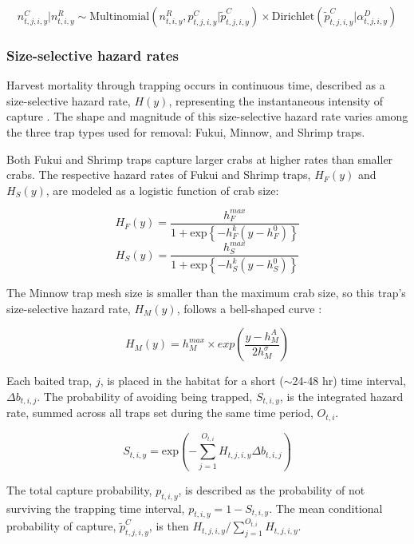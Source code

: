 \documentclass{article}
\begin{document}
\begin{equation}
n^C_{t,j,i,y} | n^R_{t,i,y} \sim \text{Multinomial}(n^R_{t,i,y}, p^C_{t,j,i,y}|\tilde{p}^C_{t,j,i,y}) \times \text{Dirichlet}(\tilde{p}^C_{t,j,i,y}| \alpha^D_{t,j,i,y})
\end{equation}

\subsubsection*{Size-selective hazard rates}

Harvest mortality through trapping occurs in continuous time, described as a size-selective hazard rate, $H(y)$, representing the instantaneous intensity of capture \parencite{ergon2018utility}. The shape and magnitude of this size-selective hazard rate varies among the three trap types used for removal: Fukui, Minnow, and Shrimp traps.

Both Fukui and Shrimp traps capture larger crabs at higher rates than smaller crabs. The respective hazard rates of Fukui and Shrimp traps, $H_F(y)$ and $H_S(y)$, are modeled as a logistic function of crab size:

\begin{equation}
H_F(y) = \frac{h^{max}_F}{1+\text{exp}\left\{-h^k_F(y-h^0_F)\right\}}
\end{equation}
\begin{equation}
H_S(y) = \frac{h^{max}_S}{1+\text{exp}\left\{-h^k_S(y-h^0_S)\right\}}
\end{equation}

The Minnow trap mesh size is smaller than the maximum crab size, so this trap's size-selective hazard rate, $H_M(y)$, follows a bell-shaped curve \parencite{jorgensen2009size}:

\begin{equation}
H_M(y) = h^{max}_M \times exp(\frac{y-h^{A}_M}{2 h^{\sigma}_M})
\end{equation}

Each baited trap, $j$, is placed in the habitat for a short ($\sim$24-48 hr) time interval, $\Delta b_{t,i,j}$. The probability of avoiding being trapped, $S_{t,i,y}$, is the integrated hazard rate, summed across all traps set during the same time period, $O_{t,i}$.

\begin{equation}
S_{t,i,y} = \text{exp}\left(-\sum_{j=1}^{O_{t,i}} H_{t,j,i,y}\Delta b_{t,i,j}\right)
\end{equation}

The total capture probability, $p_{t,i,y}$, is described as the probability of not surviving the trapping time interval, $p_{t,i,y} = 1-S_{t,i,y}$. The mean conditional probability of capture, $\tilde{p}^C_{t,j,i,y}$, is then $H_{t,j,i,y}/\sum_{j=1}^{O_{t,i}}H_{t,j,i,y}$.
\end{document}
